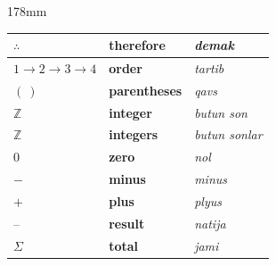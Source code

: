\documentclass[a4paper]{article}
\begin{document}
\begin{textblock*}{178mm}
{\begin{tabular}{|>{\centering\arraybackslash}p{22mm}|p{68mm}|p{72mm}|}
$\therefore$ & \textbf{therefore} & \textit{demak} \\ \hline
\rowcolor{badge!18}
$1\to2\to3\to4$ & \textbf{order} & \textit{tartib} \\ \hline
$(\ )$ & \textbf{parentheses} & \textit{qavs} \\ \hline
\rowcolor{badge!18}
$\mathbb{Z}$ & \textbf{integer} & \textit{butun son} \\ \hline
$\mathbb{Z}$ & \textbf{integers} & \textit{butun sonlar} \\ \hline
\rowcolor{badge!18}
$0$ & \textbf{zero} & \textit{nol} \\ \hline
$-$ & \textbf{minus} & \textit{minus} \\ \hline
\rowcolor{badge!18}
$+$ & \textbf{plus} & \textit{plyus} \\ \hline
-- & \textbf{result} & \textit{natija} \\ \hline
\rowcolor{badge!18}
$\Sigma$ & \textbf{total} & \textit{jami} \\ \hline
\end{tabular}
}
\end{textblock*}
\end{document}
